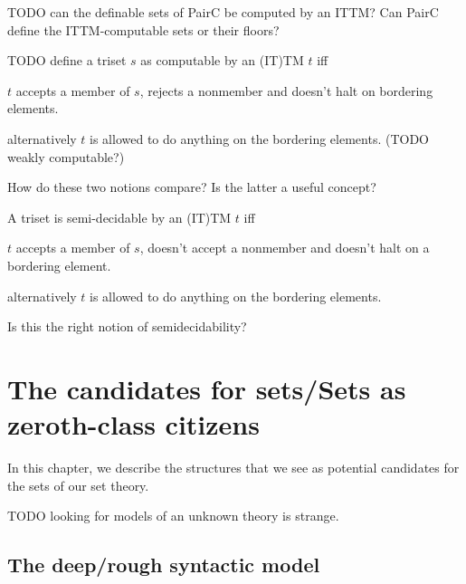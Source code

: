 \documentclass[oneside,12pt]{book}
\theoremstyle{definition}
\theoremstyle{remark}
\begin{document}
TODO can the definable sets of PairC be computed by an ITTM? Can PairC
define the ITTM-computable sets or their floors?

TODO define a triset $s$ as computable by an (IT)TM $t$ iff
\begin{compactenum}
  \item $t$ accepts a member of $s$, rejects a nonmember and doesn't halt
    on bordering elements.
  \item alternatively $t$ is allowed to do anything on the bordering elements.
    (TODO weakly computable?)
\end{compactenum}

How do these two notions compare? Is the latter a useful concept?

A triset is semi-decidable by an (IT)TM $t$ iff
\begin{compactenum}
  \item $t$ accepts a member of $s$, doesn't accept a nonmember and doesn't halt
    on a bordering element.
  \item alternatively $t$ is allowed to do anything on the bordering elements.
\end{compactenum}

Is this the right notion of semidecidability?




































\chapter{The candidates for sets/Sets as zeroth-class citizens}
In this chapter, we describe the structures that we see as potential candidates
for the sets of our set theory.

TODO looking for models of an unknown theory is strange.

\section{The deep/rough syntactic model}
\end{document}
